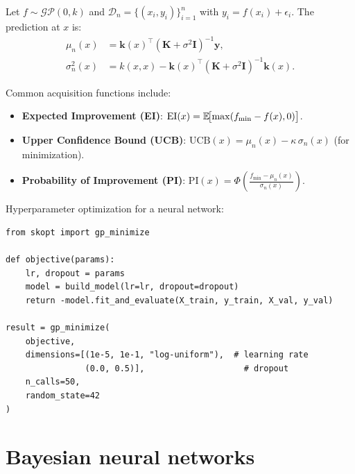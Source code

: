 \begin{theorem}
Let $f \sim \mathcal{GP}(0, k)$ and $\mathcal{D}_n = \{(x_i, y_i)\}_{i=1}^n$
with $y_i = f(x_i) + \epsilon_i$. The prediction at $x$ is:
\begin{align}
  \mu_n(x) &= \mathbf{k}(x)^\top (\mathbf{K} + \sigma^2 \mathbf{I})^{-1}\mathbf{y}, \\
  \sigma_n^2(x) &= k(x,x) - \mathbf{k}(x)^\top (\mathbf{K} + \sigma^2 \mathbf{I})^{-1}\mathbf{k}(x).
\end{align}
\end{theorem}

\begin{definition}
Common acquisition functions include:
\begin{itemize}
  \item \textbf{Expected Improvement (EI)}:
    $\mathrm{EI}(x) = \mathbb{E}\!\bigl[\max(f_{\min} - f(x), 0)\bigr]$.
  \item \textbf{Upper Confidence Bound (UCB)}:
    $\mathrm{UCB}(x) = \mu_n(x) - \kappa\,\sigma_n(x)$ (for minimization).
  \item \textbf{Probability of Improvement (PI)}:
    $\mathrm{PI}(x) = \Phi\!\left(\frac{f_{\min} - \mu_n(x)}{\sigma_n(x)}\right)$.
\end{itemize}
\end{definition}

\begin{example}
Hyperparameter optimization for a neural network:
\begin{verbatim}
from skopt import gp_minimize

def objective(params):
    lr, dropout = params
    model = build_model(lr=lr, dropout=dropout)
    return -model.fit_and_evaluate(X_train, y_train, X_val, y_val)

result = gp_minimize(
    objective,
    dimensions=[(1e-5, 1e-1, "log-uniform"),  # learning rate
                (0.0, 0.5)],                    # dropout
    n_calls=50,
    random_state=42
)
\end{verbatim}
\end{example}

\section{Bayesian neural networks}

